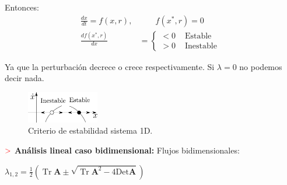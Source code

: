 \documentclass[%
 reprint,
 amsmath,amssymb,
 aps,
]{revtex4-1}
\newcommand{\propiedad}{\textcolor{red}{\mathbf{>}}}
\begin{document}
Entonces:
$$
\begin{aligned}
\frac{d x}{d t}=f(x, r), & \qquad f\left(x^{*}, r\right)=0 \\
\frac{d f\left(x^{*}, r\right)}{d x} &=\left\{\begin{array}{ll}
<0 & \text { Estable } \\
>0 & \text { Inestable }
\end{array}\right.
\end{aligned}
$$

Ya que la perturbación decrece o crece respectivamente. Si $\lambda=0$ no podemos decir nada.

\begin{figure}[ht!]
  \includegraphics[width = 0.28\textwidth]{estable-Inestable.pdf}
  \caption{\label{fig:figura1} Criterio de estabilidad sistema 1D.}
\end{figure}

$\propiedad$ \textbf{Análisis lineal caso bidimensional:}
Flujos bidimensionales:

$\lambda_{1,2}=\frac{1}{2}\left(\operatorname{Tr} \mathbf{A} 
\pm 
\sqrt{\operatorname{Tr} \mathbf{A}^{2}-4 \mathrm{Det} \mathbf{A}  } \right)$
\end{document}
